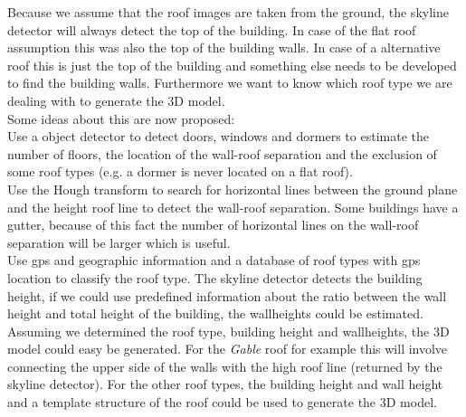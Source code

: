 \documentclass[10pt]{article}
\begin{document}
Because we assume that the roof images are taken from the ground, the skyline
detector will always detect the top of the building. In case of the flat roof
assumption this was also the top of the building walls.
In case of a alternative roof this is just the top of the building and something
else needs to be developed to find the building walls. Furthermore we want to
know which roof type we are dealing with to generate the 3D model.\\
Some ideas about this are now proposed:\\
Use a object detector to detect doors, windows and dormers to estimate the
number of floors, the location of the wall-roof separation and the exclusion of
some roof types (e.g. a dormer is never located on a flat roof).\\
Use the Hough transform to search for horizontal lines between the ground plane and the
height roof line to detect the wall-roof separation. Some buildings have a gutter,
because of this fact the number of horizontal lines on the wall-roof separation
will be larger which is useful.\\
Use gps and geographic information and a database of roof types with gps location
to classify the roof type. The skyline detector detects the building height, if we
could use predefined information about the ratio between the wall height and
total height of the building, the wallheights could be estimated.\\
Assuming we determined the roof type, building height and wallheights, the 3D model could 
easy be generated. 
For the \emph{Gable} roof for example this will involve connecting the upper side of the
walls with the high roof line (returned by the skyline detector). For the other
roof types, the building height and wall height and a template structure of the
roof could be used to generate the 3D model.

\end{document}
